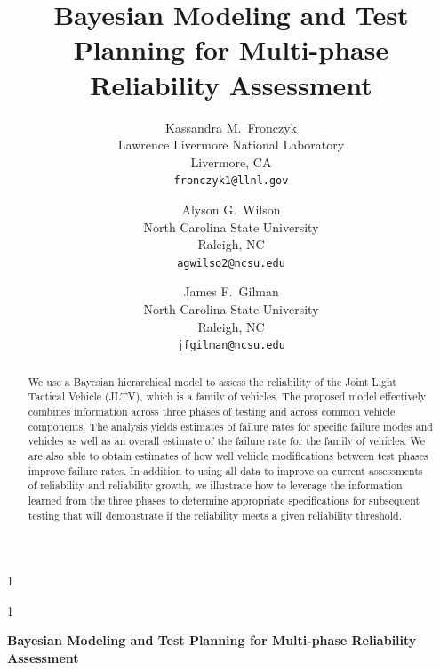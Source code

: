 \documentclass[12pt]{article}
\newcommand{\blind}{1}
\begin{document}
%

\def\spacingset#1{\renewcommand{\baselinestretch}%
{#1}\small\normalsize} \spacingset{1}



\blind
{
\title{Bayesian Modeling and Test Planning for Multi-phase Reliability Assessment}

\author{Kassandra M.\ Fronczyk\\Lawrence Livermore National Laboratory\\Livermore, CA\\\texttt{fronczyk1@llnl.gov} \and
Alyson G.\ Wilson\\North Carolina State University\\Raleigh, NC\\\texttt{agwilso2@ncsu.edu} \and
James F.\ Gilman\\North Carolina State University\\Raleigh, NC\\\texttt{jfgilman@ncsu.edu}
}
\maketitle} \fi

\blind
{
  \bigskip
  \bigskip
  \bigskip
  \begin{center}
    {\LARGE\bf Bayesian Modeling and Test Planning for Multi-phase Reliability Assessment}
\end{center}
  \medskip
} \fi

\bigskip

\begin{abstract}
    We use a Bayesian hierarchical model to assess the reliability of the Joint
    Light Tactical Vehicle (JLTV), which is a family of vehicles. The proposed
    model effectively combines information across three phases of testing and
    across common vehicle components. The analysis yields estimates of failure
    rates for specific failure modes and vehicles as well as an overall estimate
    of the failure rate for the family of vehicles. We are also able to obtain
    estimates of how well vehicle modifications between test phases improve
    failure rates. In addition to using all data to improve on current
    assessments of reliability and reliability growth, we illustrate how to
    leverage the information learned from the three phases to determine
    appropriate specifications for subsequent testing that will demonstrate if
    the reliability meets a given reliability threshold.
\end{abstract}
\end{document}

